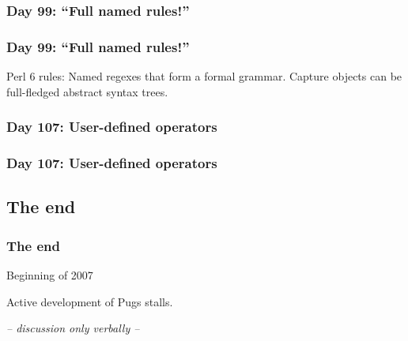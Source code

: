 \documentclass[12pt,compress,english,utf8,t]{beamer}
\newcommand{\inputminted}[2]{}
\begin{document}
\subsubsection{Day 99: ``Full named rules!''}

\begin{frame}[label=rules]\frametitle{Day 99: ``Full named rules!''}

  Perl 6 rules: Named regexes that form a formal grammar. Capture objects can
  be full-fledged abstract syntax trees.

  \inputminted{perl}{code-snippets/day99-rules.pl}

  \hyperlink{further-highlights}{}
\end{frame}


\subsubsection{Day 107: User-defined operators}

\begin{frame}[label=user-defined-ops]\frametitle{Day 107: User-defined operators}

  \inputminted{perl}{code-snippets/day107-user-defined-ops.pl}
  \medskip
  \inputminted{haskell}{code-snippets/day107-parser.hs}

  \hyperlink{further-highlights}{}
\end{frame}


\subsection{The end}

\begin{frame}[label=the-end]\frametitle{The end}
  \begin{Mdescription}{Beginning of 2007}
    \item[Beginning of 2007]
      Active development of Pugs stalls.
  \end{Mdescription}

  \begin{center}
    \emph{-- discussion only verbally --}
  \end{center}
\end{frame}
\end{document}
